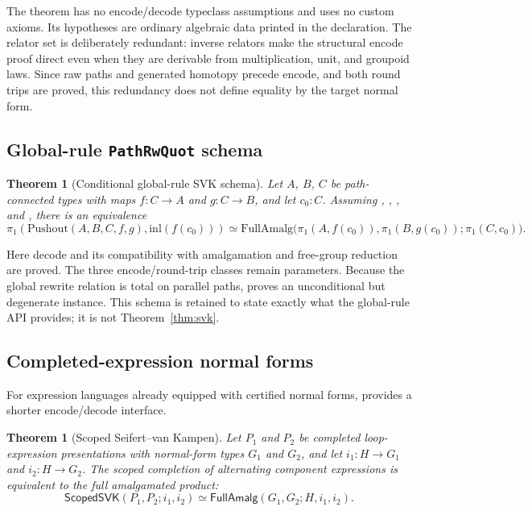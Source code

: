 \documentclass{lmcs}
\theoremstyle{definition}
\theoremstyle{plain}
\newtheorem{theorem}[definition]{Theorem}
\theoremstyle{remark}
\newcommand{\piOne}{\pi_1}
\newcommand{\Pushout}{\mathrm{Pushout}}
\newcommand{\inl}{\mathrm{inl}}
\begin{document}
The theorem has no encode/decode typeclass assumptions and uses no custom
axioms.  Its hypotheses are ordinary algebraic data printed in the declaration.
The relator set is deliberately redundant: inverse relators make the structural
encode proof direct even when they are derivable from multiplication, unit, and
groupoid laws.  Since raw paths and generated homotopy precede encode, and both
round trips are proved, this redundancy does not define equality by the target
normal form.

\subsection{Global-rule \texttt{PathRwQuot} schema}

\begin{theorem}[Conditional global-rule SVK schema]
\label{thm:global-svk}
Let $A$, $B$, $C$ be path-connected types with maps $f : C \to A$ and
$g : C \to B$, and let $c_0 : C$.  Assuming
,
,
, and
, there is an equivalence
\[
\piOne(\Pushout(A,B,C,f,g),\inl(f(c_0)))\simeq
\mathrm{FullAmalg}\bigl(\piOne(A,f(c_0)),\piOne(B,g(c_0));
\piOne(C,c_0)\bigr).
\]
\end{theorem}

Here decode and its compatibility with amalgamation and free-group reduction
are proved.  The three encode/round-trip classes remain parameters.  Because
the global rewrite relation is total on parallel paths,
 proves an unconditional but
degenerate instance.  This schema is retained to state exactly what the
global-rule API provides; it is not Theorem~\ref{thm:svk}.

\subsection{Completed-expression normal forms}

For expression languages already equipped with certified normal forms,
 provides a shorter encode/decode interface.

\begin{theorem}[Scoped Seifert--van Kampen]
\label{thm:scoped-svk}
Let \(P_1\) and \(P_2\) be completed loop-expression presentations with
normal-form types \(G_1\) and \(G_2\), and let \(i_1:H\to G_1\) and
\(i_2:H\to G_2\).  The scoped completion of alternating component expressions
is equivalent to the full amalgamated product:
\[
\mathsf{ScopedSVK}(P_1,P_2;i_1,i_2)
\simeq
\mathsf{FullAmalg}(G_1,G_2;H,i_1,i_2).
\]
\end{theorem}
\end{document}
